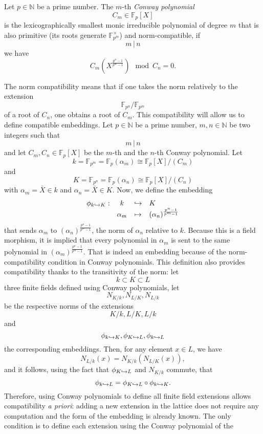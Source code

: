 \begin{defi}
  Let $p\in\mathbb{N}$ be a prime number. The $m$-th \emph{Conway polynomial}
  \[
    C_m\in\mathbb{F}_p[X]
  \]
  is the lexicographically smallest monic irreducible polynomial of degree $m$
  that is also primitive (\ie its roots generate $\mathbb{F}_{p^m}^\times$) and
  norm-compatible, \ie if
  \[
    m\,|\,n
  \]
  we have
  \[
    C_m(X^{\frac{p^n-1}{p^m-1}})\mod C_n = 0.
  \]
\end{defi}
The norm compatibility means that if one takes the norm relatively to the
extension 
\[
  \mathbb{F}_{p^n}/\mathbb{F}_{p^m}
\]
of a root of $C_n$, one obtains a root of $C_m$. This compatibility will allow
us to define compatible embeddings. Let $p\in\mathbb{N}$ be a prime number, $m,
n\in\mathbb{N}$ be two integers such that
\[
  m\,|\,n
\]
and let $C_m, C_n\in\mathbb{F}_{p}[X]$ be the $m$-th and the $n$-th Conway
polynomial. Let 
\[
  k=\mathbb{F}_{p^m}=\mathbb{F}_p(\alpha_m)\cong\mathbb{F}_{p}[X]/(C_m)
\]
and
\[
  K = \mathbb{F}_{p^n}=\mathbb{F}_p(\alpha_n)\cong\mathbb{F}_{p}[X]/(C_n)
\]
with $\alpha_m=\bar X\in k$ and $\alpha_n=\bar X\in K$. Now, we define the
embedding
\[
\begin{array}{cccl}
  \phi_{k\hookrightarrow K}:&k&\hookrightarrow &K\\
  & \alpha_m&\mapsto&(\alpha_n)^{\frac{p^n-1}{p^m-1}}
\end{array}
\]
that sends $\alpha_m$ to $(\alpha_n)^{\frac{p^n-1}{p^m-1}}$, the norm of
$\alpha_n$ relative to $k$. Because this is a field morphism, it is implied that
every polynomial in $\alpha_m$ is sent to the same polynomial in
$(\alpha_m)^{\frac{p^n-1}{p^m-1}}$. That is indeed an embedding because of the
norm-compatibility condition in Conway polynomials. This definition also
provides compatibility thanks to the transitivity of the norm: let
\[
  k\subset K\subset L
\]
three finite fields defined using Conway polynomials, let
\[
  N_{K/k}, N_{L/K}, N_{L/k}
\]
be the respective norms of the extensions
\[
  K/k, L/K, L/k
\]
and
\[
  \phi_{k\hookrightarrow K}, \phi_{K\hookrightarrow L}, \phi_{k\hookrightarrow L}
\]
the corresponding embeddings. Then, for any element $x\in L$, we have
\[
  N_{L/k}(x) = N_{K/k}(N_{L/K}(x)),
\]
and it follows, using the fact that $\phi_{K\hookrightarrow L}$ and $N_{K/k}$ commute, that
\[
  \phi_{k\hookrightarrow L}=\phi_{K\hookrightarrow L}\circ\phi_{k\hookrightarrow K}.
\]
Therefore, using Conway polynomials to define all finite field extensions allows
compatibility \emph{a priori}: adding a new extension in the lattice does not
require any computation and the form of the embedding is already known. The
only condition is to define each extension using the Conway polynomial of the
